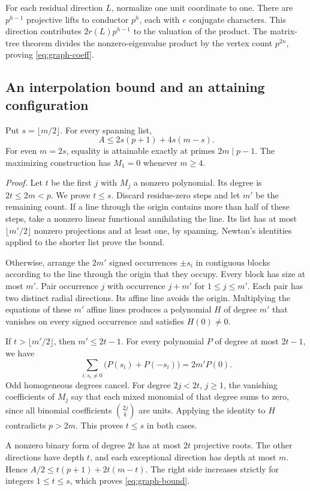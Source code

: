 For each residual direction $L$, normalize one unit coordinate to one. There are $p^{h-1}$ projective lifts to conductor $p^h$, each with $e$ conjugate characters. This direction contributes $2r(L)p^{h-1}$ to the valuation of the product. The matrix-tree theorem divides the nonzero-eigenvalue product by the vertex count $p^{2n}$, proving \eqref{eq:graph-coeff}.

\subsection{An interpolation bound and an attaining configuration}
Put $s=\lfloor m/2\rfloor$. For every spanning list,
\begin{equation}
 A\le 2s(p+1)+4s(m-s).                                      \label{eq:graph-bound}
\end{equation}
For even $m=2s$, equality is attainable exactly at primes $2m\mid p-1$. The maximizing construction has $M_1=0$ whenever $m\ge4$.

\emph{Proof.} Let $t$ be the first $j$ with $M_j$ a nonzero polynomial. Its degree is $2t\le 2m<p$. We prove $t\le s$. Discard residue-zero steps and let $m'$ be the remaining count. If a line through the origin contains more than half of these steps, take a nonzero linear functional annihilating the line. Its list has at most $\lfloor m'/2\rfloor$ nonzero projections and at least one, by spanning. Newton's identities applied to the shorter list prove the bound.

Otherwise, arrange the $2m'$ signed occurrences $\pm s_i$ in contiguous blocks according to the line through the origin that they occupy. Every block has size at most $m'$. Pair occurrence $j$ with occurrence $j+m'$ for $1\le j\le m'$. Each pair has two distinct radial directions. Its affine line avoids the origin. Multiplying the equations of these $m'$ affine lines produces a polynomial $H$ of degree $m'$ that vanishes on every signed occurrence and satisfies $H(0)\ne0$.

If $t>\lfloor m'/2\rfloor$, then $m'\le2t-1$. For every polynomial $P$ of degree at most $2t-1$, we have
\[
 \sum_{i:s_i\ne0}\big(P(s_i)+P(-s_i)\big)=2m'P(0).
\]
Odd homogeneous degrees cancel. For degree $2j<2t$, $j\ge1$, the vanishing coefficients of $M_j$ say that each mixed monomial of that degree sums to zero, since all binomial coefficients $\binom{2j}{k}$ are units. Applying the identity to $H$ contradicts $p>2m$. This proves $t\le s$ in both cases.

A nonzero binary form of degree $2t$ has at most $2t$ projective roots. The other directions have depth $t$, and each exceptional direction has depth at most $m$. Hence $A/2\le t(p+1)+2t(m-t)$. The right side increases strictly for integers $1\le t\le s$, which proves \eqref{eq:graph-bound}.

